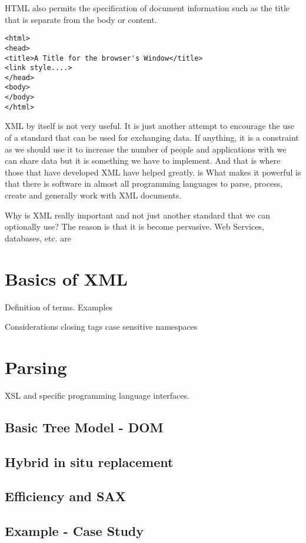 HTML also permits the specification of document information such as
the title that is separate from the body or content.
\begin{verbatim}
<html>
<head>
<title>A Title for the browser's Window</title>
<link style....>
</head>
<body>
</body>
</html>
\end{verbatim}

XML by itself is not very useful.  It is just another attempt to
encourage the use of a standard that can be used for exchanging data.
If anything, it is a constraint as we should use it to increase the
number of people and applications with we can share data
but it is something we have to implement.
And that is where those that have developed XML have helped
greatly. is What makes it powerful is
that there is software in almost all programming languages
to parse, process, create and generally work with XML
documents.

Why is XML really important and not just another standard
that we can optionally use?
The reason is that it is become pervasive.
Web Services, databases, etc.  are 

\section{Basics of XML}
Definition  of terms.
Examples

Considerations
 closing tags
 case sensitive
 namespaces

\section{Parsing}
XSL and specific programming language interfaces.

\subsection{Basic Tree Model - DOM}

\subsection{Hybrid in situ replacement}

\subsection{Efficiency and SAX}

\subsection{Example - Case Study}

